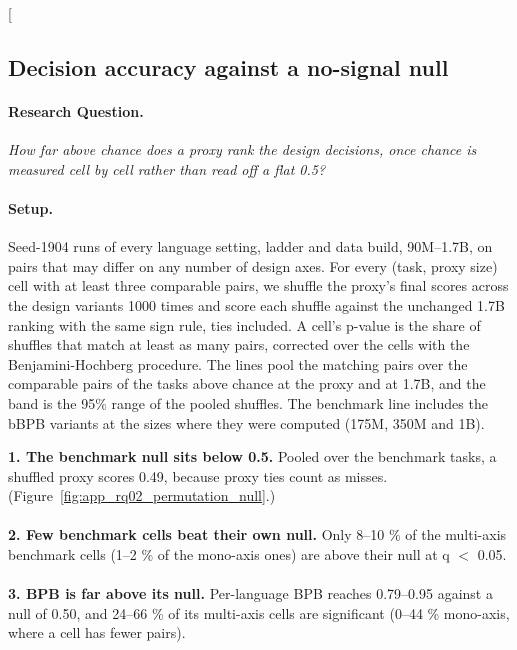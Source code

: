 \clearpage
\twocolumn[{%
\subsection{Decision accuracy against a no-signal null}
\label{app:rq02_permutation_null}

\noindent\begin{minipage}[t]{0.485\textwidth}
\vspace{0pt}
\paragraph{Research Question.} \emph{How far above chance does a proxy rank the design decisions, once chance is measured cell by cell rather than read off a flat 0.5?}

\paragraph{Setup.} Seed-1904 runs of every language setting, ladder and data build, 90M--1.7B, on pairs that may differ on any number of design axes. For every (task, proxy size) cell with at least three comparable pairs, we shuffle the proxy's final scores across the design variants 1000 times and score each shuffle against the unchanged 1.7B ranking with the same sign rule, ties included. A cell's p-value is the share of shuffles that match at least as many pairs, corrected over the cells with the Benjamini-Hochberg procedure. The lines pool the matching pairs over the comparable pairs of the tasks above chance at the proxy and at 1.7B, and the band is the 95\% range of the pooled shuffles. The benchmark line includes the bBPB variants at the sizes where they were computed (175M, 350M and 1B).
\end{minipage}\hfill
\begin{minipage}[t]{0.485\textwidth}
\vspace{0pt}
\begin{rqfinding}
\textbf{1. The benchmark null sits below 0.5.} Pooled over the benchmark tasks, a shuffled proxy scores 0.49, because proxy ties count as misses. (Figure~\ref{fig:app_rq02_permutation_null}.)
\\
\\
\textbf{2. Few benchmark cells beat their own null.} Only 8--10 \% of the multi-axis benchmark cells (1--2 \% of the mono-axis ones) are above their null at q $<$ 0.05.
\\
\\
\textbf{3. BPB is far above its null.} Per-language BPB reaches 0.79--0.95 against a null of 0.50, and 24--66 \% of its multi-axis cells are significant (0--44 \% mono-axis, where a cell has fewer pairs).
\end{rqfinding}
\end{minipage}

}
